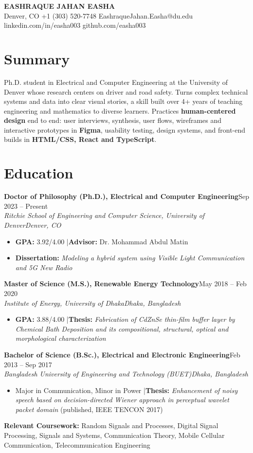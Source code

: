 \documentclass[10pt,letterpaper]{article}
\newcommand{\entry}[4]{\textbf{#1}\hfill #2\\\textit{#3}\hfill\textit{#4}\par}
\begin{document}
\begin{center}{\LARGE\bfseries\color{accent} EASHRAQUE JAHAN EASHA}\\[3pt]
Denver, CO \textbar{} +1 (303) 520-7748 \textbar{} EashraqueJahan.Easha@du.edu \textbar{} linkedin.com/in/easha003 \textbar{} github.com/easha003\end{center}\vspace{-6pt}
\section*{Summary}
Ph.D. student in Electrical and Computer Engineering at the University of Denver whose research centers on driver and road safety. Turns complex technical systems and data into clear visual stories, a skill built over 4+ years of teaching engineering and mathematics to diverse learners. Practices \textbf{human-centered design} end to end: user interviews, synthesis, user flows, wireframes and interactive prototypes in \textbf{Figma}, usability testing, design systems, and front-end builds in \textbf{HTML/CSS, React and TypeScript}.
\section*{Education}
\entry{Doctor of Philosophy (Ph.D.), Electrical and Computer Engineering}{Sep 2023 – Present}{Ritchie School of Engineering and Computer Science, University of Denver}{Denver, CO}
\begin{itemize}\item \textbf{GPA:} 3.92/4.00 \quad|\quad \textbf{Advisor:} Dr. Mohammad Abdul Matin\item \textbf{Dissertation:} \textit{Modeling a hybrid system using Visible Light Communication and 5G New Radio}\end{itemize}
\vspace{2pt}
\entry{Master of Science (M.S.), Renewable Energy Technology}{May 2018 – Feb 2020}{Institute of Energy, University of Dhaka}{Dhaka, Bangladesh}
\begin{itemize}\item \textbf{GPA:} 3.88/4.00 \quad|\quad \textbf{Thesis:} \textit{Fabrication of CdZnSe thin-film buffer layer by Chemical Bath Deposition and its compositional, structural, optical and morphological characterization}\end{itemize}
\vspace{2pt}
\entry{Bachelor of Science (B.Sc.), Electrical and Electronic Engineering}{Feb 2013 – Sep 2017}{Bangladesh University of Engineering and Technology (BUET)}{Dhaka, Bangladesh}
\begin{itemize}\item Major in Communication, Minor in Power \quad|\quad \textbf{Thesis:} \textit{Enhancement of noisy speech based on decision-directed Wiener approach in perceptual wavelet packet domain} (published, IEEE TENCON 2017)\end{itemize}
\vspace{2pt}
\textbf{Relevant Coursework:} Random Signals and Processes, Digital Signal Processing, Signals and Systems, Communication Theory, Mobile Cellular Communication, Telecommunication Engineering
\end{document}
